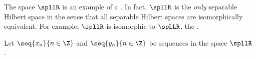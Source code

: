 The space $\spllR$ is an example of a .
In fact, $\spllR$ is the \emph{only} separable Hilbert space in the sense that all separable Hilbert spaces
are isomorphically equivalent.
For example, $\spllR$ is isomorphic to $\spLLR$, the .

\begin{definition}
\label{def:dsp_conv}
\label{def:convd}
Let $\seq{x_n}{n\in\Z}$ and $\seq{y_n}{n\in\Z}$ be sequences  in the space $\spllR$ .
\end{definition}

